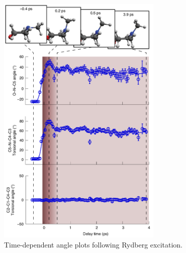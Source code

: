 \documentclass{beamer}
\begin{document}
\begin{frame}
\begin{columns}
\begin{column}{.6\textwidth}
\begin{figure}[H]
				\includegraphics[width=0.7\textwidth]{stankus_angle_plots.png}
				\caption{Time-dependent angle plots
					following Rydberg excitation.}
				\label{fig:nmm-geom}
			\end{figure}
		\end{column}%
	\end{columns}
\end{frame}
\end{document}

